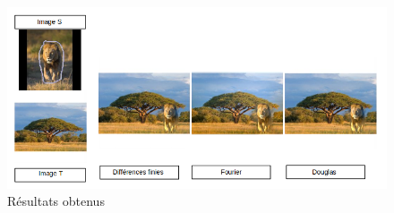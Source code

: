 \begin{figure}[!h]
\centering
\includegraphics[scale=0.5]{Images/Resultats/3.png}
\caption{Résultats obtenus}
\end{figure}

